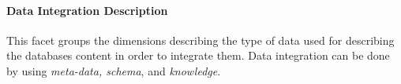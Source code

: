 \paragraph{Data Integration Description}
 This facet groups the dimensions describing the type of data used for describing the databases content in order to  integrate them. Data integration can be done by using {\em meta-data, schema}, and {\em knowledge}.


